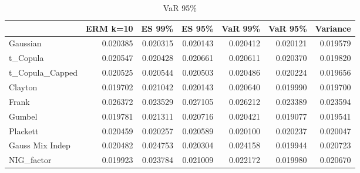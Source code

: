 \begin{table}
\begin{tabular}{lrrrrrr}
\toprule
{} &  ERM k=10 &    ES 99\% &    ES 95\% &   VaR 99\% &   VaR 95\% &  Variance \\
\midrule
Gaussian        &  0.020385 &  0.020315 &  0.020143 &  0.020412 &  0.020121 &  \color{blue}0.019579 \\
t\_Copula        &  0.020547 &  0.020428 &  0.020661 &  0.020611 &  0.020370 &  \color{blue}0.019820 \\
t\_Copula\_Capped &  0.020525 &  0.020544 &  0.020503 &  0.020486 &  0.020224 &  \color{blue}0.019656 \\
Clayton         &  0.019702 &  0.021042 &  0.020143 &  0.020640 &  0.019990 &  \color{blue}0.019700 \\
Frank           &  0.026372 &  0.023529 &  0.027105 &  0.026212 &  \color{blue}0.023389 &  0.023594 \\
Gumbel          &  0.019781 &  0.021311 &  0.020716 &  0.020421 &  \color{blue}0.019077 &  0.019541 \\
Plackett        &  0.020459 &  0.020257 &  0.020589 &  0.020100 &  0.020237 &  \color{blue}0.020047 \\
Gauss Mix Indep &  0.020482 &  0.024753 &  0.020304 &  0.024158 &  \color{blue}0.019944 &  0.020723 \\
NIG\_factor      &  \color{blue}0.019923 &  0.023784 &  0.021009 &  0.022172 &  0.019980 &  0.020670 \\
\bottomrule
\end{tabular}
\caption{VaR 95\%}
\end{table}

